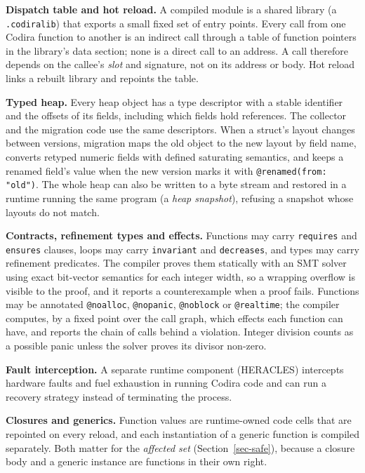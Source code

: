\documentclass[10pt,twocolumn]{article}
\begin{document}
\textbf{Dispatch table and hot reload.} A compiled module is a shared library (a \texttt{.codiralib}) that exports a small fixed set of entry points. Every call from one Codira function to another is an indirect call through a table of function pointers in the library's data section; none is a direct call to an address. A call therefore depends on the callee's \emph{slot} and signature, not on its address or body. Hot reload links a rebuilt library and repoints the table.

\textbf{Typed heap.} Every heap object has a type descriptor with a stable identifier and the offsets of its fields, including which fields hold references. The collector and the migration code use the same descriptors. When a struct's layout changes between versions, migration maps the old object to the new layout by field name, converts retyped numeric fields with defined saturating semantics, and keeps a renamed field's value when the new version marks it with \texttt{@renamed(from: "old")}. The whole heap can also be written to a byte stream and restored in a runtime running the same program (a \emph{heap snapshot}), refusing a snapshot whose layouts do not match.

\textbf{Contracts, refinement types and effects.} Functions may carry \texttt{requires} and \texttt{ensures} clauses, loops may carry \texttt{invariant} and \texttt{decreases}, and types may carry refinement predicates. The compiler proves them statically with an SMT solver using exact bit-vector semantics for each integer width, so a wrapping overflow is visible to the proof, and it reports a counterexample when a proof fails. Functions may be annotated \texttt{@noalloc}, \texttt{@nopanic}, \texttt{@noblock} or \texttt{@realtime}; the compiler computes, by a fixed point over the call graph, which effects each function can have, and reports the chain of calls behind a violation. Integer division counts as a possible panic unless the solver proves its divisor non-zero.

\textbf{Fault interception.} A separate runtime component (HERACLES) intercepts hardware faults and fuel exhaustion in running Codira code and can run a recovery strategy instead of terminating the process.

\textbf{Closures and generics.} Function values are runtime-owned code cells that are repointed on every reload, and each instantiation of a generic function is compiled separately. Both matter for the \emph{affected set} (Section~\ref{sec-safe}), because a closure body and a generic instance are functions in their own right.
\end{document}
